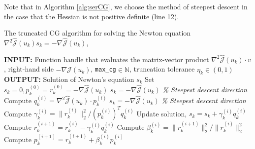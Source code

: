 Note that in Algorithm \ref{alg:serCG}, we choose the method of steepest descent in the case that the Hessian is not positive definite (line 12).
\begin{algorithm}[H]
\caption{The truncated CG algorithm for solving the Newton equation \mbox{$\nabla^2 \hat{\mathcal J}(u_k) s_k = - \nabla \hat{\mathcal J}(u_k)$}, \cite{H08}}
\label{alg:serCG}
\begin{algorithmic}[1]
\STATE \textbf{INPUT: } Function handle that evaluates the matrix-vector product $\nabla^2 \hat{\mathcal J}(u_k) \cdot v$, right-hand side $-\nabla \hat{\mathcal J}(u_k)$, \texttt{max\_cg}$ \in \mathbb{N}$, truncation tolerance $\eta_k \in (0,1)$
\STATE \textbf{OUTPUT: } Solution of Newton's equation $s_k$
\STATE Set $s_k = 0, p_k^{(0)} = r_k^{(0)} = - \nabla \hat{\mathcal J}(u_k)$
\STATE $s_k =  -\nabla \hat{\mathcal J}(u_k)$ \quad \textit{\% Steepest descent direction}
\RETURN
\ENDIF
\ENDIF
\STATE Compute $q_k^{(i)} = \nabla^2 \hat{\mathcal J}(u_k) \cdot p_k^{(i)}$
\STATE $s_k =  -\nabla \hat{\mathcal J}(u_k)$ \quad \textit{\% Steepest descent direction}
\RETURN
\ENDIF
\ENDIF
\STATE Compute $\gamma_k^{(i)} =  \|r_k^{(i)}\|^2_2 / (p_k^{(i)})^T q_k^{(i)} $
\STATE Update solution, $s_k = s_k + \gamma_k^{(i)} q_k^{(i)}$%
\STATE Compute $r_k^{(i+1)} = r_k^{(i)} - \gamma_k^{(i)} q_k^{(i)}$
\STATE Compute $\beta_k^{(i)} = \|r_k^{(i+1)}\|_2^2 / \|r_k^{(i)}\|_2^2$
\STATE Compute $p_k^{(i+1)} = r_k^{(i+1)} + \beta_k^{(i)} p_k^{(i)}$
\ENDFOR
\end{algorithmic}
\end{algorithm}
\newpage
